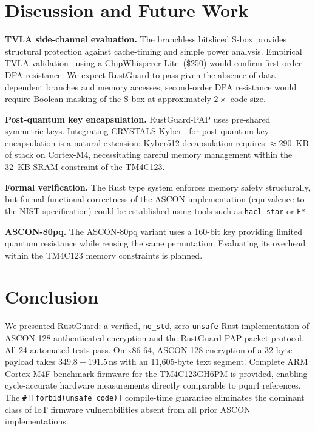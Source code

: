 \documentclass[anonymous]{ndss}
\newcommand{\code}[1]{\mbox{\texttt{#1}}}
\newcommand{\nstd}{\texttt{no\_std}}
\newcommand{\forbid}{\code{\#![forbid(unsafe\_code)]}}
\begin{document}
\section{Discussion and Future Work}
\label{sec:discussion}

\textbf{TVLA side-channel evaluation.}
The branchless bitsliced S-box provides structural protection against
cache-timing and simple power analysis. Empirical TVLA validation~\cite{b19}
using a ChipWhisperer-Lite~(\$250) would confirm first-order DPA resistance.
We expect RustGuard to pass given the absence of data-dependent branches
and memory accesses; second-order DPA resistance would require Boolean
masking of the S-box at approximately $2\times$ code size.

\textbf{Post-quantum key encapsulation.}
RustGuard-PAP uses pre-shared symmetric keys. Integrating
CRYSTALS-Kyber~\cite{b20} for post-quantum key encapsulation is a natural
extension; Kyber512 decapsulation requires $\approx$290~KB of stack on
Cortex-M4, necessitating careful memory management within the 32~KB SRAM
constraint of the TM4C123.

\textbf{Formal verification.}
The Rust type system enforces memory safety structurally, but formal
functional correctness of the ASCON implementation (equivalence to
the NIST specification) could be established using tools such as
\texttt{hacl-star} or \texttt{F*}.

\textbf{ASCON-80pq.}
The ASCON-80pq variant uses a 160-bit key providing limited quantum
resistance while reusing the same permutation. Evaluating its
overhead within the TM4C123 memory constraints is planned.

\section{Conclusion}
\label{sec:conclusion}

We presented RustGuard: a verified, \nstd{}, zero-\texttt{unsafe} Rust
implementation of ASCON-128 authenticated encryption and the
RustGuard-PAP packet protocol. All 24 automated tests pass. On x86-64,
ASCON-128 encryption of a 32-byte payload takes $349.8\pm191.5$\,ns with
an 11{,}605-byte text segment. Complete ARM Cortex-M4F benchmark firmware
for the TM4C123GH6PM is provided, enabling cycle-accurate hardware
measurements directly comparable to pqm4 references. The
\forbid{} compile-time guarantee eliminates the dominant class of
IoT firmware vulnerabilities absent from all prior ASCON implementations.
\end{document}
